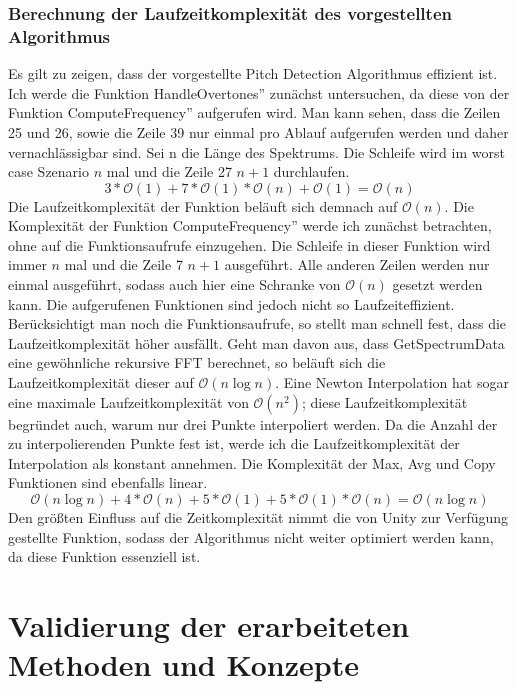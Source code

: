 \subsection*{Berechnung der Laufzeitkomplexität des vorgestellten Algorithmus}
Es gilt zu zeigen, dass der vorgestellte Pitch Detection Algorithmus effizient ist. Ich werde die Funktion \glqq HandleOvertones'' zunächst untersuchen, da diese von der Funktion \glqq ComputeFrequency'' aufgerufen wird. Man kann sehen, dass die Zeilen 25 und 26, sowie die Zeile 39 nur einmal pro Ablauf aufgerufen werden und daher vernachlässigbar sind. Sei n die Länge des Spektrums. Die Schleife wird im worst case Szenario $n$ mal und die Zeile 27 $n + 1$ durchlaufen. 
$$3 * \mathcal{O}(1) + 7 * \mathcal{O}(1) * \mathcal{O}(n) + \mathcal{O}(1) = \mathcal{O}(n) $$
Die Laufzeitkomplexität der Funktion beläuft sich demnach auf $\mathcal{O}(n)$. Die Komplexität der Funktion \glqq ComputeFrequency'' werde ich zunächst betrachten, ohne auf die Funktionsaufrufe einzugehen. Die Schleife in dieser Funktion wird immer $n$ mal und die Zeile 7 $n + 1$ ausgeführt. Alle anderen Zeilen werden nur einmal ausgeführt, sodass auch hier eine Schranke von $\mathcal{O}(n)$ gesetzt werden kann. Die aufgerufenen Funktionen sind jedoch nicht so Laufzeiteffizient. Berücksichtigt man noch die Funktionsaufrufe, so stellt man schnell fest, dass die Laufzeitkomplexität höher ausfällt. Geht man davon aus, dass GetSpectrumData eine gewöhnliche rekursive FFT berechnet, so beläuft sich die Laufzeitkomplexität dieser auf $\mathcal{O}(n \log{n})$. Eine Newton Interpolation hat sogar eine maximale Laufzeitkomplexität von $\mathcal{O}(n^2)$; diese Laufzeitkomplexität begründet auch, warum nur drei Punkte interpoliert werden. Da die Anzahl der zu interpolierenden Punkte fest ist, werde ich die Laufzeitkomplexität der Interpolation als konstant annehmen. Die Komplexität der Max, Avg und Copy Funktionen sind ebenfalls linear.
$$\mathcal{O}(n \log{n}) + 4 * \mathcal{O}(n) + 5 * \mathcal{O}(1) + 5 * \mathcal{O}(1) * \mathcal{O}(n) = \mathcal{O}(n \log{n})$$
Den größten Einfluss auf die Zeitkomplexität nimmt die von Unity zur Verfügung gestellte Funktion, sodass der Algorithmus nicht weiter optimiert werden kann, da diese Funktion essenziell ist.



\chapter{Validierung der erarbeiteten Methoden und Konzepte}

